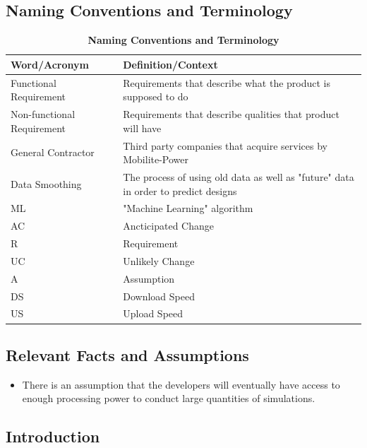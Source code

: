 \documentclass[12pt, titlepage]{article}
\begin{document}
\subsection{Naming Conventions and Terminology}

\begin{table}[htp]
\caption{\bf Naming Conventions and Terminology}
\begin{tabular}{ |p{6cm}|p{8cm}|  } 
 \hline
\bf Word/Acronym & \bf Definition/Context\\
 \hline
 Functional Requirement & Requirements that describe what the product is supposed to do\\
 \hline
Non-functional Requirement & Requirements that describe qualities that product will have\\
 \hline
General Contractor & Third party companies that acquire services by Mobilite-Power\\
 \hline
Data Smoothing & The process of using old data as well as "future" data in order to predict designs\\
 \hline
ML & "Machine Learning" algorithm\\
\hline
AC & Ancticipated Change\\
\hline 
R & Requirement\\
\hline 
UC & Unlikely Change\\
\hline 
A & Assumption\\
\hline 
DS & Download Speed\\
\hline
US & Upload Speed\\
\hline
\end{tabular}
\end{table}

\subsection{Relevant Facts and Assumptions}
\begin{itemize}
    \item There is an assumption that the developers will eventually have access to enough processing power to conduct large quantities of simulations.

\end{itemize}

\subsection{Introduction}
\end{document}

